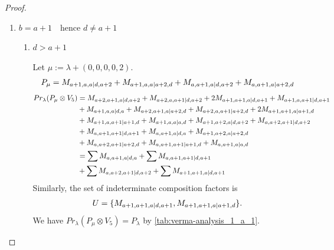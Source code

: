 \begin{proof}
\begin{enumerate}
\begin{enumerate}
\item $ b = a+1 \quad \text{hence } d\neq a+1 $\par
          \begin{enumerate}
            \item $d>a+1  $ \par
        Let $\mu:=\lambda + (0,0,0,0,2) $.
        \begin{equation}\notag
          \begin{aligned}
            P_\mu = M_{a+1,a,a|d,a+2}
+ M_{a+1,a,a|a+2,d}
+ M_{a,a+1,a|d,a+2}
+ M_{a,a+1,a|a+2,d}
          \end{aligned}
        \end{equation}
        \begin{equation}\notag
          \begin{aligned}
            Pr_{\lambda}(P_\mu \otimes V_{5}) &=
M_{a+2,a+1,a|d,a+2}
+ M_{a+2,a,a+1|d,a+2}
+ 2M_{a+1,a+1,a|d,a+1}
+ M_{a+1,a,a+1|d,a+1} \\
                                              &+ M_{a+1,a,a|d,a}
+ M_{a+2,a+1,a|a+2,d}
+ M_{a+2,a,a+1|a+2,d}
+ 2M_{a+1,a+1,a|a+1,d}\\
                                               &
+ M_{a+1,a,a+1|a+1,d}
+ M_{a+1,a,a|a,d}
+ M_{a+1,a+2,a|d,a+2}
+ M_{a,a+2,a+1|d,a+2}\\
                                               &
+ M_{a,a+1,a+1|d,a+1}
+ M_{a,a+1,a|d,a}
+ M_{a+1,a+2,a|a+2,d}\\
                                               &
+ M_{a,a+2,a+1|a+2,d}
+ M_{a,a+1,a+1|a+1,d}
+ M_{a,a+1,a|a,d} \\
                                               &=
\sum M_{a,a+1,a|d,a}
+ \sum M_{a,a+1,a+1|d,a+1}\\
                                               &
+ \sum M_{a,a+2,a+1|d,a+2}
+ \sum M_{a+1,a+1,a|d,a+1}
          \end{aligned}
        \end{equation}
      Similarly, the set of indeterminate composition factors is 
\begin{equation}\notag
  \begin{aligned}
    U = \{
M_{a+1,a+1,a|d,a+1},
M_{a+1,a+1,a|a+1,d}
\}.
  \end{aligned}
\end{equation}
       We have $Pr_{\lambda}(P_\mu \otimes V_{5}) = P_\lambda  $ by \cref{tab:verma-analysis_1_a_1}.
\begin{table}[htbp]
\centering
\caption{Calculation of Verma modules in $\operatorname{Filt}(P_*) \setminus \operatorname{Filt}(\prl(P_\lambda \otimes V_{5})) $ } \label{tab:verma-analysis_1_a_1}

\end{table}
\end{enumerate}
\end{enumerate}
\end{enumerate}
\end{proof}
